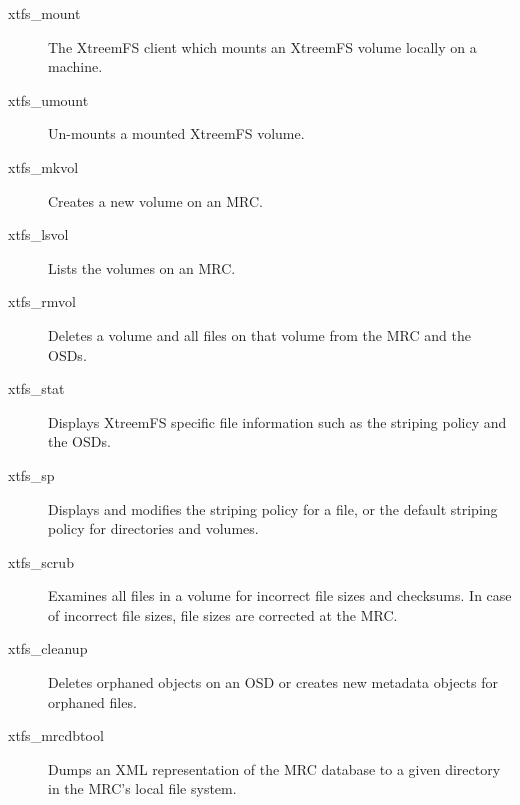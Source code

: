 \documentclass[a4paper,10pt]{book}
\begin{document}
\begin{description}
 \item[xtfs\_mount] The XtreemFS client which mounts an XtreemFS volume locally on a machine.
 \item[xtfs\_umount] Un-mounts a mounted XtreemFS volume.
 \item[xtfs\_mkvol] Creates a new volume on an MRC.
 \item[xtfs\_lsvol] Lists the volumes on an MRC.
 \item[xtfs\_rmvol] Deletes a volume and all files on that volume from the MRC and the OSDs.
 \item[xtfs\_stat] Displays XtreemFS specific file information such as the striping policy and the OSDs.
 \item[xtfs\_sp] Displays and modifies the striping policy for a file, or the default striping policy for directories and volumes.
 \item[xtfs\_scrub] Examines all files in a volume for incorrect file sizes and checksums. In case of incorrect file sizes, file sizes are corrected at the MRC.
 \item[xtfs\_cleanup] Deletes orphaned objects on an OSD or creates new metadata objects for orphaned files.
 \item[xtfs\_mrcdbtool] Dumps an XML representation of the MRC database to a given directory in the MRC's local file system.
 \end{description}

\printindex
\end{document}
